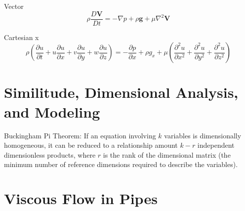 \documentclass{article}
\begin{document}
Vector
\begin{equation}
  \rho\frac{D\mathbf{V}}{Dt} = -\nabla p + \rho\mathbf{g} + \mu \nabla^2\mathbf{V}
\end{equation}

Cartesian x
\begin{equation}
  \rho\left( \frac{\partial u}{\partial t} + u\frac{\partial u}{\partial x} + v\frac{\partial u}{\partial y} + w\frac{\partial u}{\partial z}\right) = -\frac{\partial p}{\partial x} + \rho g_x + \mu\left( \frac{\partial^2 u}{\partial x^2} + \frac{\partial^2 u}{\partial y^2} + \frac{\partial^2 u}{\partial z^2}\right)
\end{equation}
%
%
\newpage
\section{Similitude, Dimensional Analysis, and Modeling}

Buckingham Pi Theorem: If an equation involving $k$ variables is dimensionally homogeneous, it can be reduced to a relationship amount $k - r$ independent dimensionless products, where $r$ is the rank of the dimensional matrix (the minimum number of reference dimensions required to describe the variables).


%
%
\newpage
\section{Viscous Flow in Pipes}
\end{document}
